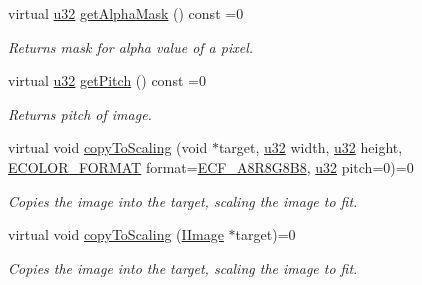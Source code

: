 \begin{DoxyCompactItemize}
\mbox{\label{classirr_1_1video_1_1IImage_a36d4f895245543080f24f99dd89930fb}} 
virtual \hyperlink{namespaceirr_a0416a53257075833e7002efd0a18e804}{u32} \hyperlink{classirr_1_1video_1_1IImage_a36d4f895245543080f24f99dd89930fb}{get\+Alpha\+Mask} () const =0
\begin{DoxyCompactList}\small\item\em Returns mask for alpha value of a pixel. \end{DoxyCompactList}\item 
\mbox{\label{classirr_1_1video_1_1IImage_aace497c2d12f217a795a546a735e2675}} 
virtual \hyperlink{namespaceirr_a0416a53257075833e7002efd0a18e804}{u32} \hyperlink{classirr_1_1video_1_1IImage_aace497c2d12f217a795a546a735e2675}{get\+Pitch} () const =0
\begin{DoxyCompactList}\small\item\em Returns pitch of image. \end{DoxyCompactList}\item 
\mbox{\label{classirr_1_1video_1_1IImage_a6f57153218f5ecd4da9aeb5a37f92f59}} 
virtual void \hyperlink{classirr_1_1video_1_1IImage_a6f57153218f5ecd4da9aeb5a37f92f59}{copy\+To\+Scaling} (void $\ast$target, \hyperlink{namespaceirr_a0416a53257075833e7002efd0a18e804}{u32} width, \hyperlink{namespaceirr_a0416a53257075833e7002efd0a18e804}{u32} height, \hyperlink{namespaceirr_1_1video_a1d5e487888c32b1674a8f75116d829ed}{E\+C\+O\+L\+O\+R\+\_\+\+F\+O\+R\+M\+AT} format=\hyperlink{namespaceirr_1_1video_a1d5e487888c32b1674a8f75116d829eda55c57d63efff39efe33ee733fe962df0}{E\+C\+F\+\_\+\+A8\+R8\+G8\+B8}, \hyperlink{namespaceirr_a0416a53257075833e7002efd0a18e804}{u32} pitch=0)=0
\begin{DoxyCompactList}\small\item\em Copies the image into the target, scaling the image to fit. \end{DoxyCompactList}\item 
\mbox{\label{classirr_1_1video_1_1IImage_aa969bf7167171a18003e26ff7876febd}} 
virtual void \hyperlink{classirr_1_1video_1_1IImage_aa969bf7167171a18003e26ff7876febd}{copy\+To\+Scaling} (\hyperlink{classirr_1_1video_1_1IImage}{I\+Image} $\ast$target)=0
\begin{DoxyCompactList}\small\item\em Copies the image into the target, scaling the image to fit. \end{DoxyCompactList}\item 

\end{DoxyCompactItemize}
